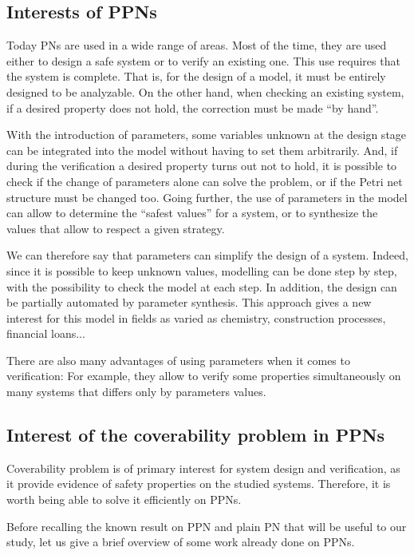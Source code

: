 \subsection{Interests of \acp{PPN}}


Today \acp{PN} are used in a wide range of areas. Most of the time, they are used either to design a safe system or to verify an existing one. This use requires that the system is complete. That is, for the design of a model, it must be entirely designed to be analyzable. On the other hand, when checking an existing system, if a desired property does not hold, the correction must be made ``by hand''.

With the introduction of parameters, some variables unknown at the design stage can be integrated into the model without having to set them arbitrarily. And, if during the verification a desired property turns out not to hold, it is possible to check if the change of parameters alone can solve the problem, or if the Petri net structure must be changed too. Going further, the use of parameters in the model can allow to determine the ``safest values'' for a system, or to synthesize the values that allow to respect a given strategy.

We can therefore say that parameters can simplify the design of a system. Indeed, since it is possible to keep unknown values, modelling can be done step by step, with the possibility to check the model at each step.
In addition, the design can be partially automated by parameter synthesis.
This approach gives a new interest for this model in fields as varied as chemistry, construction processes, financial loans...

There are also many advantages of using parameters when it comes to verification:
For example, they allow to verify some properties simultaneously on many systems that differs only by parameters values.

\subsection{Interest of the coverability problem in \acp{PPN}}


Coverability problem is of primary interest for system design and verification, as it provide evidence of safety properties on the studied systems. Therefore, it is worth being able to solve it efficiently on \acp{PPN}.

Before recalling the known result on \ac{PPN} and plain \ac{PN} that will be useful to our study, let us give a brief overview of some work already done on \acp{PPN}.


